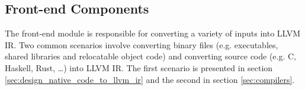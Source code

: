 
\subsection{Front-end Components}
\label{sec:front-end_components}

The front-end module is responsible for converting a variety of inputs into LLVM IR. Two common scenarios involve converting binary files (e.g. executables, shared libraries and relocatable object code) and converting source code (e.g. C, Haskell, Rust, …) into LLVM IR. The first scenario is presented in section \ref{sec:design_native_code_to_llvm_ir} and the second in section \ref{sec:compilers}.




